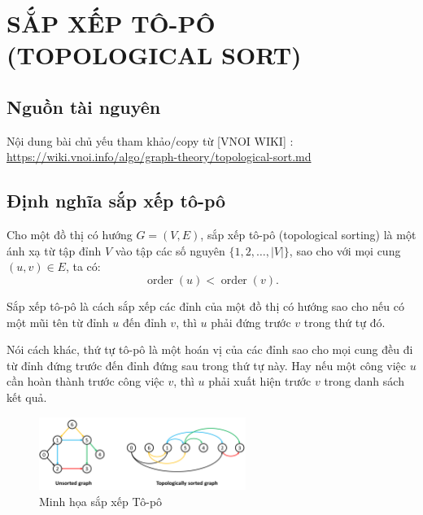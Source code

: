 \chapter{SẮP XẾP TÔ-PÔ (TOPOLOGICAL SORT)}

\minitoc

\section{Nguồn tài nguyên}

Nội dung bài chủ yếu tham khảo/copy từ [VNOI WIKI] : \url{https://wiki.vnoi.info/algo/graph-theory/topological-sort.md}

\section{Định nghĩa sắp xếp tô-pô}

\begin{dinhnghia}
Cho một đồ thị có hướng \( G = (V, E) \), sắp xếp tô-pô (topological sorting) là một ánh xạ từ tập đỉnh \( V \) vào tập các số nguyên \( \{1, 2, \dots, |V|\} \), sao cho với mọi cung \( (u, v) \in E \), ta có:
\[
\operatorname{order}(u) < \operatorname{order}(v).
\]
\end{dinhnghia}

\begin{dinhnghia}
    Sắp xếp tô-pô là cách sắp xếp các đỉnh của một đồ thị có hướng sao cho nếu có một mũi tên từ đỉnh \( u \) đến đỉnh \( v \), thì \( u \) phải đứng trước \( v \) trong thứ tự đó.
\end{dinhnghia}

Nói cách khác, thứ tự tô-pô là một hoán vị của các đỉnh sao cho mọi cung đều đi từ đỉnh đứng trước đến đỉnh đứng sau trong thứ tự này. Hay nếu một công việc \( u \) cần hoàn thành trước công việc \( v \), thì \( u \) phải xuất hiện trước \( v \) trong danh sách kết quả.



\begin{figure}[H]
    \centering
    \includegraphics[width=0.6\textwidth]{resource/img/b2/topological_sort_img1.png}
    \caption{Minh họa sắp xếp Tô-pô}
\end{figure}

